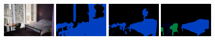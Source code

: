 \begin{figure}[tbh!]
  {\includegraphics[width=0.24\textwidth]{figures/experiments/coco/image/0021.jpg}}
  {\includegraphics[width=0.24\textwidth]{figures/experiments/coco/orgckpt/0021.png}}
  {\includegraphics[width=0.24\textwidth]{figures/experiments/coco/nonnoisy/0021.png}}
  {\includegraphics[width=0.24\textwidth]{figures/experiments/coco/gt/000000001993_instanceTrainIds.png}}
  

\end{figure}

